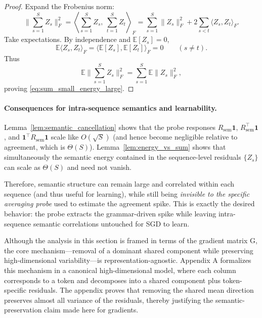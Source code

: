 \begin{proof}
Expand the Frobenius norm:
\[
\Big\|\sum_{s=1}^S Z_s\Big\|_F^2
=
\left\langle \sum_{s=1}^S Z_s,\ \sum_{t=1}^S Z_t\right\rangle_F
=
\sum_{s=1}^S \|Z_s\|_F^2
+
2\sum_{s<t} \langle Z_s, Z_t\rangle_F.
\]
Take expectations. By independence and $\mathbb{E}[Z_s]=0$,
\[
\mathbb{E}\langle Z_s, Z_t\rangle_F
=
\langle \mathbb{E}[Z_s],\mathbb{E}[Z_t]\rangle_F
=
0
\qquad (s\neq t).
\]
Thus
\[
\mathbb{E}\Big\|\sum_{s=1}^S Z_s\Big\|_F^2
=
\sum_{s=1}^S \mathbb{E}\|Z_s\|_F^2,
\]
proving \eqref{eq:sum_small_energy_large}.
\end{proof}

\paragraph{Consequences for intra-sequence semantics and learnability.}
Lemma~\ref{lem:semantic_cancellation} shows that the probe responses
$R_{\mathrm{sem}}\mathbf{1}$, $R_{\mathrm{sem}}^\top\mathbf{1}$, and $\mathbf{1}^\top R_{\mathrm{sem}}\mathbf{1}$
scale like $O(\sqrt{S})$ (and hence become negligible relative to agreement, which is $\Theta(S)$).
Lemma~\ref{lem:energy_vs_sum} shows that simultaneously the semantic energy contained in the
sequence-level residuals $\{Z_s\}$ can scale as $\Theta(S)$ and need not vanish.

Therefore, semantic structure can remain large and correlated within each sequence (and thus
useful for learning), while still being \emph{invisible to the specific averaging probe} used to
estimate the agreement spike. This is exactly the desired behavior: the probe extracts the
grammar-driven spike while leaving intra-sequence semantic correlations untouched for SGD to learn.

Although the analysis in this section is framed in terms of the gradient matrix G, the core mechanism—removal of a dominant shared component while preserving high-dimensional variability—is representation-agnostic. Appendix A formalizes this mechanism in a canonical high-dimensional model, where each column corresponds to a token and decomposes into a shared component plus token-specific residuals. The appendix proves that removing the shared mean direction preserves almost all variance of the residuals, thereby justifying the semantic-preservation claim made here for gradients.